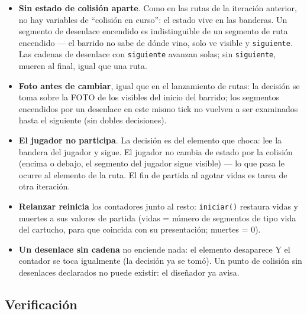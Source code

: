 \begin{itemize}
	\item \textbf{Sin estado de colisión aparte}. Como en las rutas de la iteración
	anterior, no hay variables de ``colisión en curso'': el estado vive en las
	banderas. Un segmento de desenlace encendido es indistinguible de un segmento de
	ruta encendido --- el barrido no sabe de dónde vino, solo ve visible y
	\texttt{siguiente}. Las cadenas de desenlace con \texttt{siguiente} avanzan
	solas; sin \texttt{siguiente}, mueren al final, igual que una ruta.
	\item \textbf{Foto antes de cambiar}, igual que en el lanzamiento de rutas: la
	decisión se toma sobre la FOTO de los visibles del inicio del barrido; los
	segmentos encendidos por un desenlace en este mismo tick no vuelven a ser
	examinados hasta el siguiente (sin dobles decisiones).
	\item \textbf{El jugador no participa}. La decisión es del elemento que choca:
	lee la bandera del jugador y sigue. El jugador no cambia de estado por la
	colisión (encima o debajo, el segmento del jugador sigue visible) --- lo que
	pasa le ocurre al elemento de la ruta. El fin de partida al agotar vidas es tarea de otra iteración.
	\item \textbf{Relanzar reinicia} los contadores junto al resto: \texttt{iniciar()}
	restaura vidas y muertes a sus valores de partida (vidas = número de segmentos
	de tipo vida del cartucho, para que coincida con su presentación; muertes = 0).
	\item \textbf{Un desenlace sin cadena} no enciende nada: el elemento desaparece
	Y el contador se toca igualmente (la decisión ya se tomó). Un punto de colisión
	sin desenlaces declarados no puede existir: el diseñador ya avisa.
\end{itemize}

\subsection{Verificación}
\label{subsec:VerificacionF3I8}

